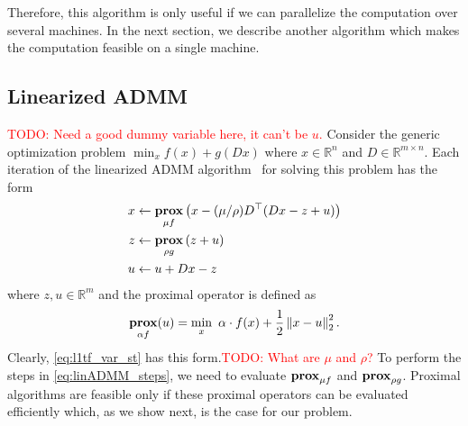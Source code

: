 \documentclass{article}
\newcommand{\attn}[1]{\textcolor{red}{TODO: #1}}
\newcommand{\norm}[1]{\left\lVert #1 \right\rVert}
\DeclareMathOperator*{\prox}{\bf prox}
\begin{document}
Therefore, this algorithm is only useful if we can parallelize the
computation over several machines. In the next section, we describe
another algorithm which makes the computation feasible on a single
machine. 

\subsection{Linearized ADMM}
\label{sec:linADMM}


\attn{Need a good dummy variable here, it can't be $u$.} Consider the generic optimization problem
$\min_x f(x)+g(Dx)$
where $x\in \mathbb{R}^n$ and $D\in \mathbb{R}^{m\times n}$. Each
iteration of the linearized ADMM
algorithm~\citep{parikh_proximal_2014} for solving this problem 
has the form
\begin{align}
x & \leftarrow \prox_{\mu f} \left(x - (\mu/\rho)D^\top (D x - z + u )\right)\\
z & \leftarrow \prox_{\rho g} \left(z + u\right) \label{eq:linADMM_steps}\\
u & \leftarrow u + D x - z
\end{align}
 where $z,u\in \mathbb{R}^m$ and the proximal operator is defined as
\begin{equation}
 \prox_{\alpha f}(u) = \min_x \,\, \alpha \cdot f(x)+\frac{1}{2} \norm{ x-u}_2^2.
\label{eq:linADMM_prox}
\end{equation}
Clearly,
\eqref{eq:l1tf_var_st} has this form.\attn{What are $\mu$ and $\rho$?}
To perform the steps in \eqref{eq:linADMM_steps}, we need to evaluate
$\prox_{\mu f}$ and $\prox_{\rho g}$. Proximal
algorithms are feasible only if these proximal operators can be
evaluated efficiently which, as we show next, is the case for our
problem.  
\end{document}
